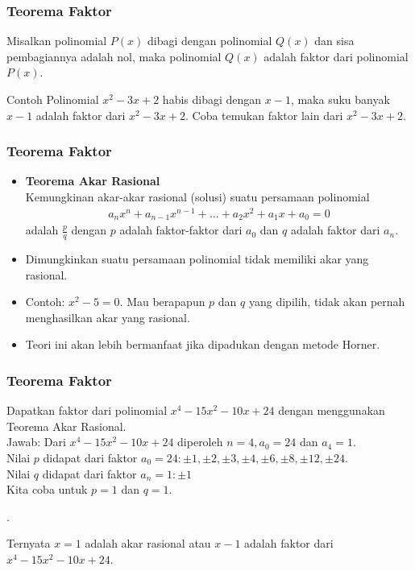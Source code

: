 \documentclass[11pt]{beamer}
\begin{document}
	\begin{frame}
		\frametitle{Teorema Faktor}
		Misalkan polinomial $P(x)$ dibagi dengan polinomial $Q(x)$ dan sisa pembagiannya adalah nol, maka polinomial $Q(x)$ adalah faktor dari polinomial $P(x)$.
		\begin{exampleblock}{Contoh}
			Polinomial $x^2-3x+2$ habis dibagi dengan $x-1$, maka suku banyak $x-1$ adalah faktor dari $x^2-3x+2$. Coba temukan faktor lain dari $x^2-3x+2$.  
		\end{exampleblock}
	\end{frame}
	
	\begin{frame}
		\frametitle{Teorema Faktor}
		\begin{itemize}
			\item \textbf{Teorema Akar Rasional}\\
			Kemungkinan akar-akar rasional (solusi) suatu persamaan polinomial
			\begin{align*}
				a_nx^n+a_{n-1}x^{n-1}+...+a_2x^2+a_1x+a_0=0
			\end{align*}
			 adalah $\frac{p}{q}$ dengan $p$ adalah faktor-faktor dari $a_0$ dan $q$ adalah faktor dari $a_n$.
			\item Dimungkinkan suatu persamaan polinomial tidak memiliki akar yang rasional. 
			\item Contoh: $x^2-5=0.$ Mau berapapun $p$ dan $q$ yang dipilih, tidak akan pernah menghasilkan akar yang rasional.
			\item Teori ini akan lebih bermanfaat jika dipadukan dengan metode Horner.
		\end{itemize}
	\end{frame}
	
	\begin{frame}
		\frametitle{Teorema Faktor}
		Dapatkan faktor dari polinomial $x^4-15x^2-10x+24$ dengan menggunakan Teorema Akar Rasional.\\Jawab:
		Dari $x^4-15x^2-10x+24$ diperoleh $n=4, a_0=24$ dan $a_4=1$.\\
		Nilai $p$ didapat dari faktor $a_0=24:\pm1, \pm2, \pm3, \pm4, \pm6, \pm8, \pm12, \pm24.$\\
		Nilai $q$ didapat dari faktor $a_n=1:\pm1$\\
		Kita coba untuk $p=1$ dan $q=1$.
		\begin{center}
			\polyhornerscheme[x=1,stage=10,tutor=false,resultstyle=\color{blue}]{x^4-15x^2-10x+24}.
		\end{center}
		Ternyata $x=1$ adalah akar rasional atau $x-1$ adalah faktor dari $x^4-15x^2-10x+24$.
		  
	\end{frame}
	
\end{document}
